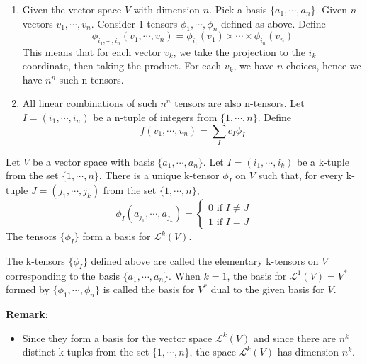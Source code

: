 \begin{itemize}
\begin{enumerate}
        $$f(v_1,\cdots,v_n)=\det(\begin{bmatrix}
            v_1 & \cdots & v_n
        \end{bmatrix})$$
        Recall the geometric meaning of the determinant, it is linear in each column of the matrix. Hence the $f$ we defined is a n-tensor.
        \item Given the vector space $V$ with dimension $n$. Pick a basis $\{a_1,\cdots,a_n\}$. Given $n$ vectors $v_1,\cdots,v_n$. 
        Consider 1-tensors $\phi_1,\cdots,\phi_n$ defined as above. Define $$\phi_{i_1,\cdots,i_n}(v_1,\cdots,v_n)=\phi_{i_1}(v_1)\times \cdots \times \phi_{i_n}(v_n)$$
        This means that for each vector $v_k$, we take the projection to the $i_k$ coordinate, then taking the product. For each $v_k$, we have $n$ choices, hence we have $n^n$ such n-tensors.
        \item All linear combinations of such $n^n$ tensors are also n-tensors. Let $I=(i_1,\cdots,i_n)$ be a n-tuple of integers from $\{1,\cdots,n\}$. Define 
        $$f(v_1,\cdots,v_n)=\sum_{I}c_I\phi_I$$
    \end{enumerate}
\end{itemize}

\begin{theorem}
    Let $V$ be a vector space with basis $\{a_1,\cdots,a_n\}$. Let $I=(i_1,\cdots,i_k)$ be a k-tuple from the set $\{1,\cdots,n\}$. There is a unique k-tensor $\phi_I$ on $V$ such that, 
    for every k-tuple $J=(j_1,\cdots,j_k)$ from the set $\{1,\cdots,n\}$, 
    \begin{equation*}
        \phi_I(a_{j_1},\cdots,a_{j_k})= \begin{cases}
            0 \text{ if }I\neq J\\
            1 \text{ if }I = J
        \end{cases}
    \end{equation*}
    The tensors $\{\phi_I\}$ form a basis for $\mathcal{L}^k(V)$.
\end{theorem}

\begin{definition}
    The k-tensors $\{\phi_I\}$ defined above are called the \underline{elementary k-tensors on $V$} corresponding to the basis $\{a_1,\cdots,a_n\}$. When $k=1$, the basis for $\mathcal{L}^1(V)=V^*$ formed by $\{\phi_1,\cdots,\phi_n\}$ is called the basis for $V^*$ dual to the given basis for $V$.
\end{definition}

\noindent\textbf{Remark}:
\begin{itemize}
    \item Since they form a basis for the vector space $\mathcal{L}^k(V)$ and since there are $n^k$ distinct k-tuples from the set $\{1,\cdots,n\}$, the space $\mathcal{L}^k(V)$ has dimension $n^k$. 
\end{itemize}

